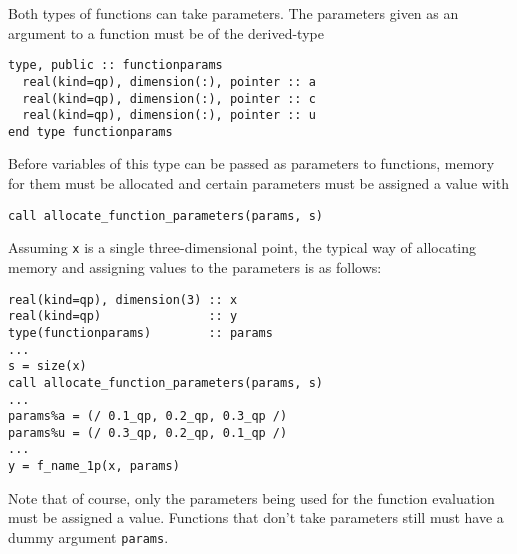 Both types of functions can take parameters.  The parameters given as an
argument to a function must be of the derived-type
\begin{lstlisting}
type, public :: functionparams
  real(kind=qp), dimension(:), pointer :: a
  real(kind=qp), dimension(:), pointer :: c
  real(kind=qp), dimension(:), pointer :: u
end type functionparams
\end{lstlisting}
%
Before variables of this type can be passed as parameters to functions, memory
for them must be allocated and certain parameters must be assigned a value with
\begin{lstlisting}
call allocate_function_parameters(params, s)
\end{lstlisting}
Assuming \verb!x! is a single three-dimensional point, the typical way of
allocating memory and assigning values to the parameters is as follows:
\begin{lstlisting}
real(kind=qp), dimension(3) :: x
real(kind=qp)               :: y
type(functionparams)        :: params
...
s = size(x)
call allocate_function_parameters(params, s)
...
params%a = (/ 0.1_qp, 0.2_qp, 0.3_qp /)
params%u = (/ 0.3_qp, 0.2_qp, 0.1_qp /)
...
y = f_name_1p(x, params)
\end{lstlisting}
Note that of course, only the parameters being used for the function evaluation
must be assigned a value.  Functions that don't take parameters still must have
a dummy argument \verb!params!.
